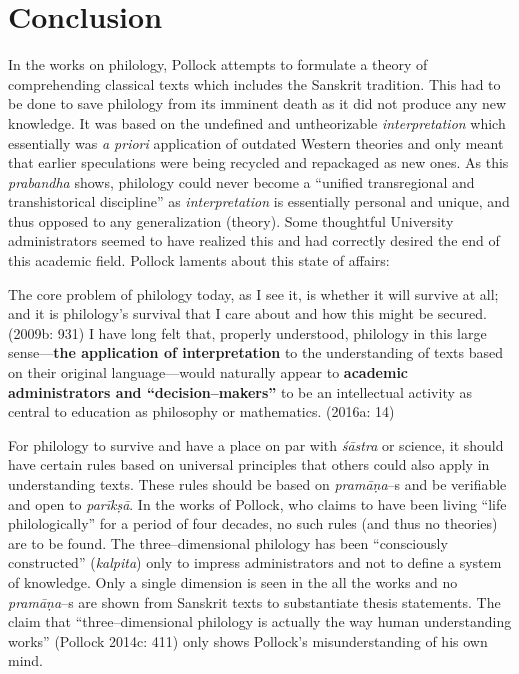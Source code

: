 
\chapter{Conclusion}\label{chapter8}

In the works on philology, Pollock attempts to formulate a theory of comprehending classical texts which includes the Sanskrit tradition. This had to be done to save philology from its imminent death as it did not produce any new knowledge. It was based on the undefined and untheorizable \textit{interpretation} which essentially was \textit{a priori} application of outdated Western theories and only meant that earlier speculations were being recycled and repackaged as new ones. As this \textit{prabandha} shows, philology could never become a “unified transregional and transhistorical discipline” as \textit{interpretation} is essentially personal and unique, and thus opposed to any generalization (theory). Some thoughtful University administrators seemed to have realized this and had correctly desired the end of this academic field. Pollock laments about this state of affairs:

\begin{myquote}
The core problem of philology today, as I see it, is whether it will survive at all; and it is philology’s survival that I care about and how this might be secured. (2009b: 931) I have long felt that, properly understood, philology in this large sense—\textbf{the application of interpretation }to the understanding of texts based on their original language—would naturally appear to \textbf{academic administrators and “decision–makers”} to be an intellectual activity as central to education as philosophy or mathematics. (2016a: 14)
\end{myquote}

For philology to survive and have a place on par with \textit{śāstra} or science, it should have certain rules based on universal principles that others could also apply in understanding texts. These rules should be based on \textit{pramāṇa}–s and be verifiable and open to \textit{parīkṣā}. In the works of Pollock, who claims to have been living “life philologically” for a period of four decades, no such rules (and thus no theories) are to be found. The three–dimensional philology has been “consciously constructed” (\textit{kalpita}) only to impress administrators and not to define a system of knowledge. Only a single dimension is seen in the all the works and no \textit{pramāṇa}–s are shown from Sanskrit texts to substantiate thesis statements. The claim that “three–dimensional philology is actually the way human understanding works” (Pollock 2014c: 411) only shows Pollock’s misunderstanding of his own mind.

